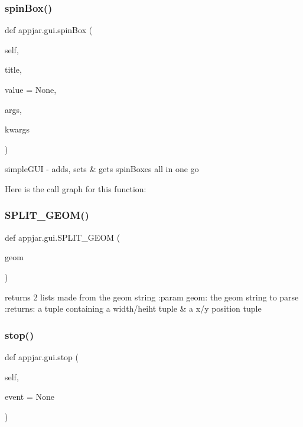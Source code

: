 \begin{DoxyVerb}
\subsubsection{\texorpdfstring{spin\+Box()}{spinBox()}}
{\footnotesize\ttfamily def appjar.\+gui.\+spin\+Box (\begin{DoxyParamCaption}\item[{}]{self,  }\item[{}]{title,  }\item[{}]{value = {\ttfamily None},  }\item[{}]{args,  }\item[{}]{kwargs }\end{DoxyParamCaption})}

\begin{DoxyVerb}simpleGUI - adds, sets & gets spinBoxes all in one go \end{DoxyVerb}
 Here is the call graph for this function\+:
\mbox{\label{classappjar_1_1gui_a13b2067ca27ab714ae2a9f53c266f2b3}} 
\subsubsection{\texorpdfstring{S\+P\+L\+I\+T\+\_\+\+G\+E\+O\+M()}{SPLIT\_GEOM()}}
{\footnotesize\ttfamily def appjar.\+gui.\+S\+P\+L\+I\+T\+\_\+\+G\+E\+OM (\begin{DoxyParamCaption}\item[{}]{geom }\end{DoxyParamCaption})\hspace{0.3cm}{\ttfamily [static]}}

\begin{DoxyVerb}returns 2 lists made from the geom string
:param geom: the geom string to parse
:returns: a tuple containing a width/heiht tuple & a x/y position tuple
\end{DoxyVerb}
 \mbox{\label{classappjar_1_1gui_a28ff5fbc0aa77aacf692082a00af676b}} 
\subsubsection{\texorpdfstring{stop()}{stop()}}
{\footnotesize\ttfamily def appjar.\+gui.\+stop (\begin{DoxyParamCaption}\item[{}]{self,  }\item[{}]{event = {\ttfamily None} }\end{DoxyParamCaption})}


\end{DoxyVerb}
